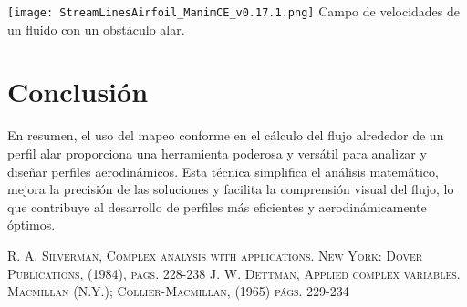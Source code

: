 \documentclass[portrait]{Hylangtechposter}
\begin{document}
\begin{multicols}{2}
\begin{center}\vspace{0.5cm}
\texttt{[image: StreamLinesAirfoil\_ManimCE\_v0.17.1.png]}
 {Campo de velocidades de un fluido con un obstáculo alar.}
\end{center}\vspace{0.5cm}
\section*{Conclusión }

\noindent En resumen, el uso del mapeo conforme en el cálculo del flujo alrededor de un perfil alar proporciona una herramienta poderosa y versátil para analizar y diseñar perfiles aerodinámicos. Esta técnica simplifica el análisis matemático, mejora la precisión de las soluciones y facilita la comprensión visual del flujo, lo que contribuye al desarrollo de perfiles más eficientes y aerodinámicamente óptimos.


\begin{thebibliography}{X}
\large {}  \textsc{R. A. Silverman, Complex analysis with applications. New York: Dover Publications, (1984), págs. 228-238 }
\large {} \textsc{ J. W. Dettman, Applied complex variables. Macmillan (N.Y.); Collier-Macmillan, (1965) págs. 229-234} 

\end{thebibliography}

\end{multicols}
\end{document}
